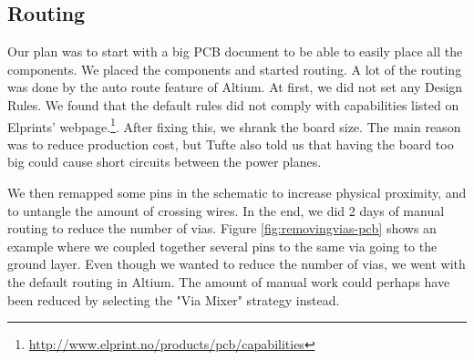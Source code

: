 \subsection {Routing}
\label{sec: pcb_routing}

Our plan was to start with a big PCB document to be able to easily place all the components. We placed the components and started routing. A lot of the routing was done by the auto route feature of Altium. At first, we did not set any Design Rules. We found that the default rules did not comply with capabilities listed on Elprints' webpage.\footnote {\url{http://www.elprint.no/products/pcb/capabilities}}. After fixing this, we shrank the board size. The main reason was to reduce production cost, but Tufte also told us that having the board too big could cause short circuits between the power planes.

We then remapped some pins in the schematic to increase physical proximity, and to untangle the amount of crossing wires. In the end, we did 2 days of manual routing to reduce the number of vias. Figure \ref{fig:removingvias-pcb} shows an example where we coupled together several pins to the same via going to the ground layer. Even though we wanted to reduce the number of vias, we went with the default routing in Altium. The amount of manual work could perhaps have been reduced by selecting the "Via Mixer" strategy instead. 


